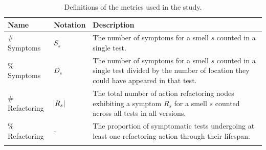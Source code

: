 \begin{table}
\centering

\caption{Definitions of the metrics used in the study.}
\label{tab:metrics}

\begin{tabular}{>{\raggedright}p{1in}>{\raggedright}p{0.5in}>{\raggedright}p{2.9in}}

\toprule
\scriptsize{\textbf{Name}} & \scriptsize{\textbf{Notation}} & \scriptsize{\textbf{Description}} \tabularnewline
\toprule

\scriptsize{\# Symptoms} & \scriptsize{$S_s$} & \scriptsize{The number of symptoms for a smell $s$ counted in a single test.} \tabularnewline \noalign{\vspace{4pt}}
\scriptsize{\% Symptoms} & \scriptsize{$D_s$} & \scriptsize{The number of symptoms for a smell $s$ counted in a single test divided by the number of location they could have appeared in that test.} \tabularnewline \noalign{\vspace{4pt}}
\scriptsize{\# Refactoring} & \scriptsize{$\abs{R_{s}}$} & \scriptsize{The total number of action refactoring nodes exhibiting a symptom $R_{s}$ for a smell $s$ counted across all tests in all versions.} \tabularnewline \noalign{\vspace{4pt}}
\scriptsize{\% Refactoring} & \scriptsize{-} & \scriptsize{The proportion of symptomatic tests undergoing at least one refactoring action through their lifespan.} \tabularnewline \noalign{\vspace{4pt}}
\bottomrule

\end{tabular}



\end{table}